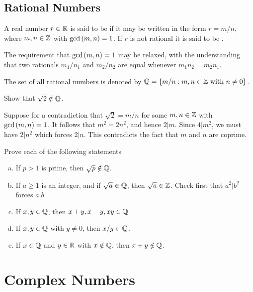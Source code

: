 \documentclass[11pt,fleqn,dvipsnames,usenames]{article}
\begin{document}
\subsection{Rational Numbers}

\recall A real number $r\in\mathbb{R}$ is said to be  if it may be written in the form $r = m/n$, where $m,n\in\mathbb{Z}$ with $\text{gcd}\left(m, n\right) = 1$.  If $r$ is not rational it is said to be .
\vsp

\begin{remark}
The requirement that $\text{gcd}\left(m,n\right) = 1$ may be relaxed, with the understanding that two rationals $m_{1}/n_{1}$ and $m_{2}/n_{2}$ are equal whenever $m_{1}n_{2} = m_{2}n_{1}$.
\end{remark}

\notation The set of all rational numbers is denoted by $\mathbb{Q} = \left\{m/n:m,n\in\mathbb{Z}\text{ with } n\neq 0\right\}$.
\vsp

\begin{example}
Show that $\sqrt{2} \notin \mathbb{Q}$.
\end{example}

\solution Suppose for a contradiction that $\sqrt{2} = m/n$ for some $m,n\in\mathbb{Z}$ with $\text{gcd}\left(m, n\right) = 1$.  It follows that $m^2 = 2n^2$, and hence $2|m$.  Since $4|m^2$, we must have $2|n^2$ which forces $2|n$.  This contradicts the fact that $m$ and $n$ are coprime.
\vsp

\begin{exercise} Prove each of the following statements
\begin{enumerate}[(a)]
\item If $p > 1$ is prime, then $\sqrt{p}\notin\mathbb{Q}$.
\item If $a\geq 1$ is an integer, and if $\sqrt{a}\in \mathbb{Q}$, then $\sqrt{a}\in\mathbb{Z}$.  \hint Check first that $a^2|b^2$ forces $a|b$.
\item If $x,y\in\mathbb{Q}$, then $x+y, x-y, xy\in\mathbb{Q}$.
\item If $x,y\in\mathbb{Q}$ with $y\neq 0$, then $x/y\in\mathbb{Q}$.
\item If $x\in\mathbb{Q}$ and $y\in\mathbb{R}$ with $x\notin\mathbb{Q}$, then $x+y\notin\mathbb{Q}$.
\end{enumerate}
\end{exercise}

\section{Complex Numbers}
\end{document}
